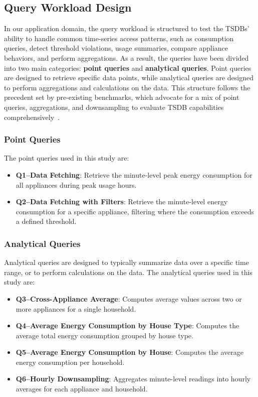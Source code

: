 \documentclass[conference]{IEEEtran}
\begin{document}
\subsection{Query Workload Design}
In our application domain, the query workload is structured to test the TSDBs' ability to handle common time-series access patterns, such as consumption queries, detect threshold violations, usage summaries, compare appliance behaviors, and perform aggregations.
As a result, the queries have been divided into two main categories: \textbf{point queries} and \textbf{analytical queries}. Point queries are designed to retrieve specific data points, while analytical queries are designed to perform aggregations and calculations on the data. This structure follows the precedent set by pre-existing benchmarks, which advocate for a mix of point queries, aggregations, and downsampling to evaluate TSDB capabilities comprehensively~\cite{3_tsbs,11_iotdbencoding2022}.
\subsubsection{Point Queries}
The point queries used in this study are:
\begin{itemize}
    \item \textbf{Q1--Data Fetching}: Retrieve the minute-level peak energy consumption for all appliances during peak usage hours.
    \item \textbf{Q2--Data Fetching with Filters}: Retrieve the minute-level energy consumption for a specific appliance, filtering where the consumption exceeds a defined threshold.
\end{itemize}
\subsubsection{Analytical Queries}
Analytical queries are designed to typically summarize data over a specific time range, or to perform calculations on the data. The analytical queries used in this study are:
\begin{itemize}
  \item \textbf{Q3--Cross-Appliance Average}: Computes average values across two or more appliances for a single household. 
  \item \textbf{Q4--Average Energy Consumption by House Type}: Computes the average total energy consumption grouped by house type.   
  \item \textbf{Q5--Average Energy Consumption by House}: Computes the average energy consumption per household.      
  \item \textbf{Q6--Hourly Downsampling}: Aggregates minute-level readings into hourly averages for each appliance and household.     
\end{itemize}
\end{document}
